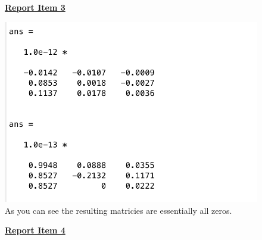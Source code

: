 \documentclass{article}
\begin{document}
\begin{figure}[H]
\color{red}
\underline{\textbf{Report Item 3}}
\color{black}

\includegraphics[scale = .5]{report3_1}
\\As you can see the resulting matricies are essentially all zeros.
\end{figure}

\begin{figure}[H]
\color{red}
\underline{\textbf{Report Item 4}}
\color{black}

\end{figure}
\end{document}
